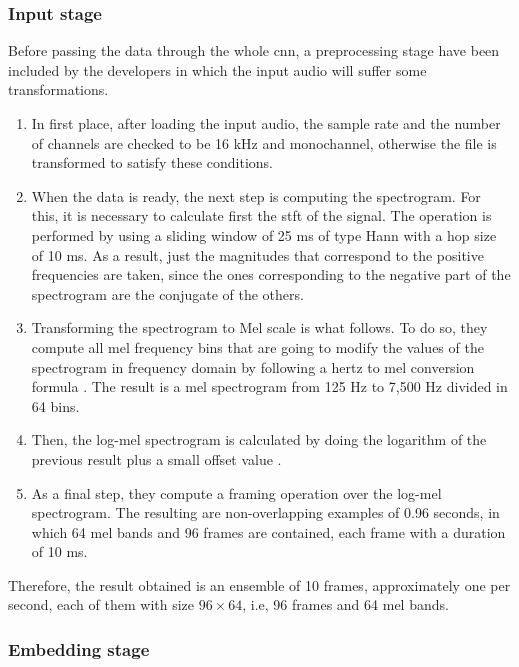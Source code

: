 	\subsubsection*{Input stage}
	
	Before passing the data through the whole \acrshort{cnn}, a preprocessing stage have been included by the developers in which the input audio will suffer some transformations. 
	
	\begin{enumerate}
	\item In first place, after loading the input audio, the sample rate and the number of channels are checked to be 16 kHz and monochannel, otherwise the file is transformed to satisfy these conditions.
	\item When the data is ready, the next step is computing the spectrogram. For this, it is necessary to calculate first the \acrfull{stft} of the signal. The operation is performed by using a sliding window of 25 ms of type Hann with a hop size of 10 ms. As a result, just the magnitudes that correspond to the positive frequencies are taken, since the ones corresponding to the negative part of the spectrogram are the conjugate of the others.
	\item  Transforming the spectrogram to Mel scale is what follows. To do so, they compute all mel frequency bins that are going to modify the values of the spectrogram in frequency domain by following a hertz to mel conversion formula . The result is a mel spectrogram from 125 Hz to 7,500 Hz divided in 64 bins.
	\item Then, the log-mel spectrogram is calculated by doing the logarithm of the previous result plus a small offset value .
	\item As a final step, they compute a framing operation over the log-mel spectrogram. The resulting are non-overlapping examples of 0.96 seconds, in which 64 mel bands and 96 frames are contained, each frame with a duration of 10 ms.
	\end{enumerate}

	Therefore, the result obtained is an ensemble of 10 frames, approximately one per second, each of them with size $96 \times 64$, i.e, 96 frames and 64 mel bands.
	
	\subsubsection*{Embedding stage}
	
